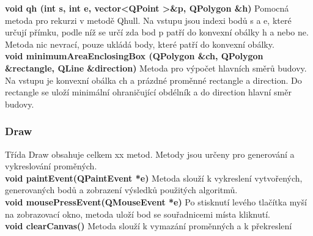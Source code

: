 \documentclass[a4paper, 12pt]{article}
\begin{document}
\textbf{void qh (int s, int e, vector\textless QPoint \textgreater \&p, QPolygon \&h)}
Pomocná metoda pro rekurzi v metodě Qhull. Na vstupu jsou indexi bodů s a e, které určují přímku, podle níž se určí zda bod p patří do konvexní obálky h a nebo ne. Metoda nic nevrací, pouze ukládá body, které patří do konvexní obálky.
\\

\textbf{void minimumAreaEnclosingBox (QPolygon \&ch, QPolygon \&rectangle, QLine \&direction)}
Metoda pro výpočet hlavních směrů budovy. Na vstupu je konvexní obálka ch a prázdné proměnné rectangle a direction. Do rectangle se uloží minimální ohraničující obdélník a do direction hlavní směr budovy.
\\

\subsubsection{Draw}
Třída Draw obsahuje celkem xx metod. Metody jsou určeny pro generování a vykreslování proměných.
\\

\textbf{void paintEvent(QPaintEvent *e)}
Metoda slouží k vykreslení vytvořených, generovaných bodů a zobrazení výsledků použitých algoritmů.
\\

\textbf{void mousePressEvent(QMouseEvent *e)}
Po stisknutí levého tlačítka myší na zobrazovací okno, metoda uloží bod se souřadnicemi místa kliknutí.
\\

\textbf{void clearCanvas()}
Metoda slouží k vymazání proměnných a k překreslení
\\
\end{document}
